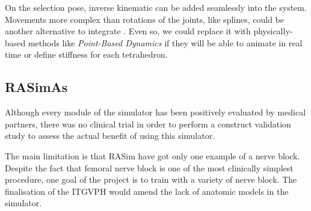 On the selection pose, inverse kinematic \cite{Shi:2007} can be added seamlessly into the system. Movements more complex than rotations of the joints, like splines, could be another alternative to integrate \cite{joints}.
Even so, we could replace it with physically-based methods like \emph{Point-Based Dynamics} \cite{abu2015position} if they will be able to animate in real time or define stiffness for each tetrahedron.

\subsection{RASimAs}

Although every module of the simulator has been positively evaluated by medical partners, there was no clinical trial in order to perform a construct validation study to assess the actual benefit of using this simulator.

The main limitation is that \acs{RASim} have got only one example of a nerve block. Despite the fact that femoral nerve block is one of the most clinically simplest procedure, one goal of the project is to train with a variety of nerve block. The finalisation of the \acs{ITGVPH} would amend the lack of anatomic models in the simulator.

